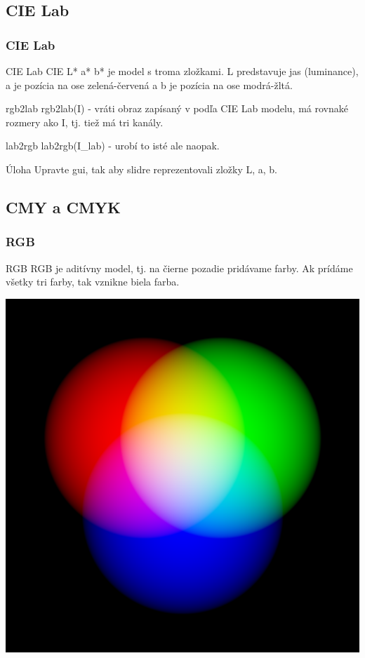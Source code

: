 \documentclass{beamer}
\begin{document}
\subsection{CIE Lab}
\begin{frame}
\frametitle{CIE Lab}
  \begin{block}{CIE Lab}
  CIE L* a* b* je model s troma zložkami. L predstavuje jas (luminance), a je pozícia na ose zelená-červená a b je pozícia na ose modrá-žltá.
  \end{block} 

  
  \begin{block}{rgb2lab}
  rgb2lab(I) - vráti obraz zapísaný v podľa CIE Lab modelu, má rovnaké rozmery ako I, tj. tiež má tri kanály.
  \end{block} 
  
    
  \begin{block}{lab2rgb}
  lab2rgb(I\_lab) - urobí to isté ale naopak.
  \end{block} 

  
  \begin{block}{Úloha}
  Upravte gui, tak aby slidre reprezentovali zložky L, a, b.
  \end{block} 
\end{frame}

\subsection{CMY a CMYK}

\begin{frame}
\frametitle{RGB}
  \begin{block}{RGB}
  RGB je aditívny model, tj. na čierne pozadie pridávame farby. Ak prídáme všetky tri farby, tak vznikne biela farba. 
  \end{block} 

  \begin{center}
  \includegraphics[height=0.5\textheight]{RGB.png}
  \end{center}
\end{frame}
\end{document}
